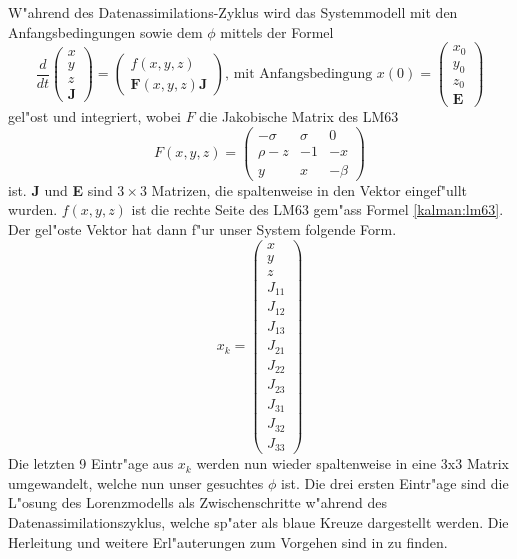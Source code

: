 \begin{refsection}
W"ahrend des Datenassimilations-Zyklus wird das Systemmodell mit den Anfangsbedingungen sowie dem $\phi$ mittels der Formel
\[
\frac{d}{dt}\begin{pmatrix}
x \\ 
y \\ 
z \\ 
\textbf{J}
\end{pmatrix}=
\begin{pmatrix}
f(x,y,z) \\ 
\textbf{F}(x,y,z)\textbf{J}
\end{pmatrix} 
\text{, mit Anfangsbedingung }
x(0)=\begin{pmatrix}
x_{0}\\
y_{0}\\
z_{0}\\ 
\textbf{E}
\end{pmatrix} 
\]
gel"ost und integriert, wobei $F$ die Jakobische Matrix des LM63 
\[
F(x,y,z) = \begin{pmatrix}
-\sigma & \sigma & 0 \\ 
\rho-z & -1 & -x \\ 
y & x & -\beta
\end{pmatrix} 
\]
ist. \textbf{J} und \textbf{E} sind $3\times3$ Matrizen, die spaltenweise in den Vektor eingef"ullt wurden. $f(x,y,z)$ ist die rechte Seite des LM63 gem"ass Formel \eqref{kalman:lm63}. Der gel"oste Vektor hat dann f"ur unser System folgende Form.
\[
x_{k}=\begin{pmatrix}
x \\ 
y \\ 
z \\  
J_{11} \\ 
J_{12} \\ 
J_{13} \\ 
J_{21} \\ 
J_{22} \\ 
J_{23} \\ 
J_{31} \\ 
J_{32} \\
J_{33} 
\end{pmatrix}
\]
Die letzten 9 Eintr"age aus $x_{k}$ werden nun wieder spaltenweise in eine 3x3 Matrix umgewandelt, welche nun unser gesuchtes $\phi$ ist. Die drei ersten Eintr"age sind die L"osung des Lorenzmodells als Zwischenschritte w"ahrend des Datenassimilationszyklus, welche sp"ater als blaue Kreuze dargestellt werden. Die Herleitung und weitere Erl"auterungen zum Vorgehen sind in \cite{skript:DiffGl} zu finden.\\


\end{refsection}
